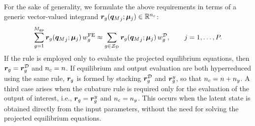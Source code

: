\documentclass[preprint,10pt]{elsarticle}  %
\begin{document}
For the sake of generality, we formulate the above   requirements in
terms of a generic vector-valued  integrand
\(\bm{r}_{g}({\bm{q}_M}_j;\bm{\mu}_j)\in\mathbb{R}^{n_c}\):
 \begin{equation}
\label{eq:approxGEN}
\sum_{g=1}^{M_{\mathrm{gp}}}
\bm{r}_{g}({\bm{q}_M}_j;\bm{\mu}_j)\,w^{\mathrm{FE}}_{g}
\approx
\sum_{g\in\mathcal{Z}_{\mathcal{D}}}
\bm{r}_{g}({\bm{q}_M}_j;\bm{\mu}_j)\,w^{\mathcal{D}}_{g},
\qquad
j=1,\ldots,P .
\end{equation}
If the rule is employed
only to evaluate the projected equilibrium equations, then
\(\bm{r}_{g}=\bm{r}^{\mathcal{D}}_{g}\) and \(n_c=n\). If equilibrium and output
evaluation are both hyperreduced using the same rule,
\(\bm{r}_{g}\) is formed by stacking \(\bm{r}^{\mathcal{D}}_{g}\) and
\(\bm{r}^{{y}}_{g}\), so that \(n_c=n+n_{{y}}\). A third case arises
when the cubature rule is required only for the
evaluation of the output of interest, i.e.,
\(\bm{r}_{g}=\bm{r}^{{y}}_{g}\) and \(n_c=n_{{y}}\). This   occurs when the
latent state is obtained directly from the input parameters,
without the need for solving the projected equilibrium equations.
\end{document}
